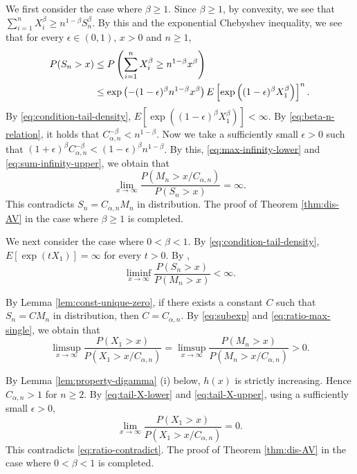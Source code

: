 \documentclass[a4paper, reqno, 11pt]{amsart}
\theoremstyle{definition}
\begin{document}
We first consider the case where $\beta \ge 1$. 
Since $\beta \ge 1$, by convexity, 
we see that $\sum_{i=1}^{n} X_i^{\beta} \ge n^{1-\beta} S_n^{\beta}$. 
By this and the exponential Chebyshev inequality, 
we see that for every $\epsilon \in (0,1)$, $x > 0$ and $n \ge 1$, 
\begin{align}\label{eq:sum-infinity-upper}
P(S_n > x) &\le P\left( \sum_{i=1}^{n} X_i^{\beta} \ge n^{1-\beta} x^{\beta} \right) \notag\\
&\le \exp\left(-(1-\epsilon)^{\beta} n^{1-\beta} x^{\beta} \right) E\left[ \exp\left((1-\epsilon)^{\beta}X_1^{\beta} \right) \right]^n.
\end{align} 
By \eqref{eq:condition-tail-density}, 
$E\left[ \exp\left((1-\epsilon)^{\beta} X_1^{\beta} \right) \right]< \infty$. 
By \eqref{eq:beta-n-relation}, it holds that $C_{\alpha,n}^{-\beta} < n^{1-\beta}$. 
Now we take a sufficiently small $\epsilon > 0$ such that $(1+\epsilon)^{\beta} C_{\alpha,n}^{-\beta} < (1-\epsilon)^{\beta} n^{1-\beta}$. 
By this, \eqref{eq:max-infinity-lower} and \eqref{eq:sum-infinity-upper}, 
we obtain that 
\[ \lim_{x \to \infty} \frac{P\left(M_n > x/C_{\alpha,n} \right)}{P(S_n > x)} = \infty. \]
This contradicts $S_n = C_{\alpha,n} M_n$ in distribution. 
The proof of Theorem \ref{thm:dis-AV} in the case where $\beta \ge 1$ is completed. 




We next consider the case where $0 < \beta < 1$. 
By \eqref{eq:condition-tail-density}, $E[\exp(t X_1)] = \infty$ for every $t > 0$. 
By \cite[Theorem 2]{DFK2008}, 
\begin{equation}\label{eq:subexp} 
\liminf_{x \to \infty} \frac{P(S_n > x)}{P(M_n > x)} < \infty. 
\end{equation}

By Lemma \ref{lem:const-unique-zero}, if there exists a constant $C$ such that $S_n = CM_n$ in distribution, 
then $C = C_{\alpha,n}$. 
By \eqref{eq:subexp} and \eqref{eq:ratio-max-single}, 
we obtain that 
\begin{equation}\label{eq:ratio-contradict}
\limsup_{x \to \infty} \frac{P(X_1 > x)}{P(X_1 > x/C_{\alpha,n})} =  \limsup_{x \to \infty} \frac{P(M_n > x)}{P(M_n > x/C_{\alpha,n})} > 0. 
\end{equation}

By Lemma \ref{lem:property-digamma} (i) below, $h(x)$ is strictly increasing.  
Hence $C_{\alpha,n} > 1$ for $n \ge 2$. 
By \eqref{eq:tail-X-lower} and \eqref{eq:tail-X-upper},  using a sufficiently small $\epsilon > 0$, 
\[ \lim_{x \to \infty} \frac{P(X_1 > x)}{P(X_1 > x/C_{\alpha,n})} = 0. \]
This contradicts \eqref{eq:ratio-contradict}. 
The proof of Theorem \ref{thm:dis-AV} in the case where $0 < \beta < 1$ is completed. 
\end{document}
